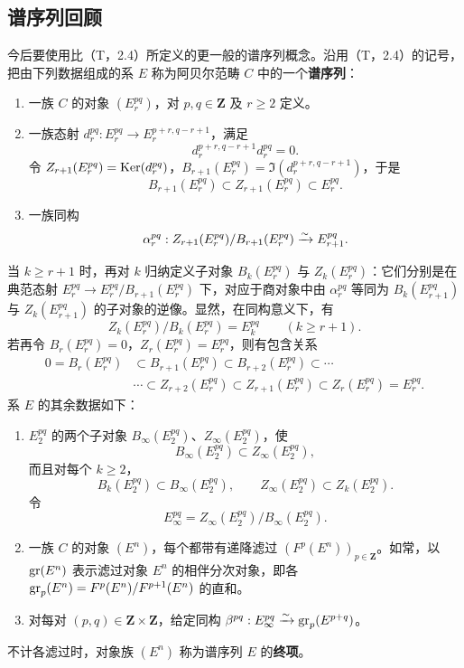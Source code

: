\subsection{谱序列回顾}
今后要使用比（T，2.4）所定义的更一般的谱序列概念。沿用（T，2.4）的记号，把由下列数据组成的系 $E$ 称为阿贝尔范畴 $C$ 中的一个\textbf{谱序列}：
\begin{enumerate}[label=\alph*)]
\item 一族 $C$ 的对象 $(E_r^{pq})$，对 $p,q\in\mathbf Z$ 及 $r\geq2$ 定义。
\item 一族态射 $d_r^{pq}:E_r^{pq}\to E_r^{p+r,q-r+1}$，满足
\[
d_r^{p+r,q-r+1}d_r^{pq}=0.
\]
令 $Z_{r+1}(E_r^{pq})=\operatorname{Ker}(d_r^{pq})$，$B_{r+1}(E_r^{pq})=\Im(d_r^{p+r,q-r+1})$，于是
\[
B_{r+1}(E_r^{pq})\subset Z_{r+1}(E_r^{pq})\subset E_r^{pq}.
\]
\item 一族同构
\[
\alpha_r^{pq}:Z_{r+1}(E_r^{pq})/B_{r+1}(E_r^{pq})\xrightarrow{\sim} E_{r+1}^{pq}.
\]
\end{enumerate}
当 $k\geq r+1$ 时，再对 $k$ 归纳定义子对象 $B_k(E_r^{pq})$ 与 $Z_k(E_r^{pq})$：它们分别是在典范态射 $E_r^{pq}\to E_r^{pq}/B_{r+1}(E_r^{pq})$ 下，对应于商对象中由 $\alpha_r^{pq}$ 等同为 $B_k(E_{r+1}^{pq})$ 与 $Z_k(E_{r+1}^{pq})$ 的子对象的逆像。显然，在同构意义下，有
\begin{equation}\tag{11.1.1.1}
Z_k(E_r^{pq})/B_k(E_r^{pq})=E_k^{pq}\qquad(k\geq r+1).
\end{equation}
若再令 $B_r(E_r^{pq})=0$，$Z_r(E_r^{pq})=E_r^{pq}$，则有包含关系
\begin{equation}\tag{11.1.1.2}
\begin{aligned}
0=B_r(E_r^{pq})&\subset B_{r+1}(E_r^{pq})\subset B_{r+2}(E_r^{pq})\subset\cdots\\
&\cdots\subset Z_{r+2}(E_r^{pq})\subset Z_{r+1}(E_r^{pq})\subset Z_r(E_r^{pq})=E_r^{pq}.
\end{aligned}
\end{equation}
系 $E$ 的其余数据如下：
\begin{enumerate}[label=\alph*),start=4]
\item $E_2^{pq}$ 的两个子对象 $B_\infty(E_2^{pq})$、$Z_\infty(E_2^{pq})$，使
\[
B_\infty(E_2^{pq})\subset Z_\infty(E_2^{pq}),
\]
而且对每个 $k\geq2$，
\[
B_k(E_2^{pq})\subset B_\infty(E_2^{pq}),\qquad
Z_\infty(E_2^{pq})\subset Z_k(E_2^{pq}).
\]
令
\begin{equation}\tag{11.1.1.3}
E_\infty^{pq}=Z_\infty(E_2^{pq})/B_\infty(E_2^{pq}).
\end{equation}
\item 一族 $C$ 的对象 $(E^n)$，每个都带有递降滤过 $(F^p(E^n))_{p\in\mathbf Z}$。如常，以 $\operatorname{gr}(E^n)$ 表示滤过对象 $E^n$ 的相伴分次对象，即各 $\operatorname{gr}_p(E^n)=F^p(E^n)/F^{p+1}(E^n)$ 的直和。
\item 对每对 $(p,q)\in\mathbf Z\times\mathbf Z$，给定同构 $\beta^{pq}:E_\infty^{pq}\xrightarrow{\sim}\operatorname{gr}_p(E^{p+q})$。
\end{enumerate}
不计各滤过时，对象族 $(E^n)$ 称为谱序列 $E$ 的\textbf{终项}。

